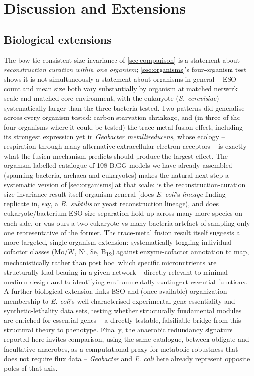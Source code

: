 \documentclass[nocrop]{bioinfo}
\begin{document}
\section{Discussion and Extensions}
\label{sec:discussion}

\subsection{Biological extensions}
The bow-tie-consistent size invariance of \cref{sec:comparison} is a statement about
\emph{reconstruction curation within one organism}; \cref{sec:organisms}'s four-organism test
shows it is not simultaneously a statement about organisms in general -- ESO count and mean
size both vary substantially by organism at matched network scale and matched core environment,
with the eukaryote (\textit{S.\ cerevisiae}) systematically larger than the three bacteria
tested. Two patterns did generalise across every organism tested: carbon-starvation shrinkage,
and (in three of the four organisms where it could be tested) the trace-metal fusion effect,
including its strongest expression yet in \textit{Geobacter metallireducens}, whose ecology --
respiration through many alternative extracellular electron acceptors -- is exactly what the
fusion mechanism predicts should produce the largest effect. The organism-labelled catalogue of
108 BiGG models we have already assembled (spanning bacteria, archaea and eukaryotes) makes the
natural next step a systematic version of \cref{sec:organisms} at that scale: is the
reconstruction-curation size-invariance result itself organism-general (does \textit{E. coli}'s
\emph{lineage} finding replicate in, say, a \textit{B.\ subtilis} or yeast reconstruction
lineage), and does eukaryote/bacterium ESO-size separation hold up across many more species on
each side, or was ours a two-eukaryote-vs-many-bacteria artefact of sampling only one
representative of the former. The trace-metal fusion result itself suggests a more targeted,
single-organism extension: systematically toggling individual cofactor classes (Mo/W, Ni, Se,
B\textsubscript{12}) against enzyme-cofactor annotation to map, mechanistically rather than post
hoc, which specific micronutrients are structurally load-bearing in a given network -- directly
relevant to minimal-medium design and to identifying environmentally contingent essential
functions. A further biological extension links ESO and (once available) organization
membership to \textit{E. coli}'s well-characterised experimental gene-essentiality and
synthetic-lethality data sets, testing whether structurally fundamental modules are enriched for
essential genes -- a directly testable, falsifiable bridge from this structural theory to
phenotype. Finally, the anaerobic redundancy signature reported here invites comparison, using
the same catalogue, between obligate and facultative anaerobes, as a computational proxy for
metabolic robustness that does not require flux data -- \textit{Geobacter} and \textit{E. coli}
here already represent opposite poles of that axis.
\end{document}
